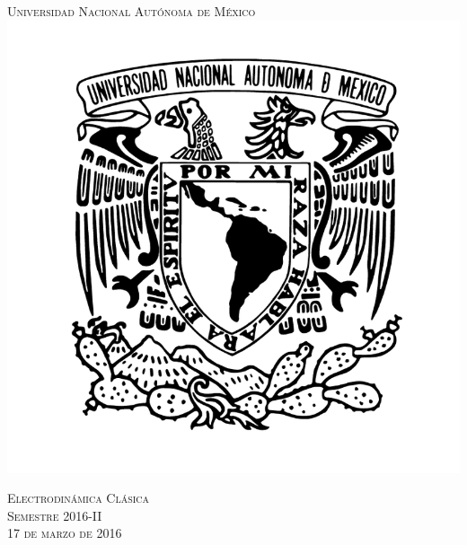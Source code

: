 \documentclass[a4paper,11pt]{article}
\numberwithin{equation}{section}
\begin{document}
\begin{titlepage}
\thispagestyle{fancy}

\newcommand{\HRule}{\rule{\linewidth}{0.5mm}} %

\center %
 

\textsc{\LARGE Universidad Nacional Autónoma de México}\\[0.3cm] %


\includegraphics[scale=0.17]{unam}


\textsc{\Large Electrodinámica Clásica}\\[0.3cm] %
\textsc{\large Semestre 2016-II}\\[0.3cm] %
\textsc{\large 17 de marzo de 2016}\\ %


\end{titlepage}
\end{document}
